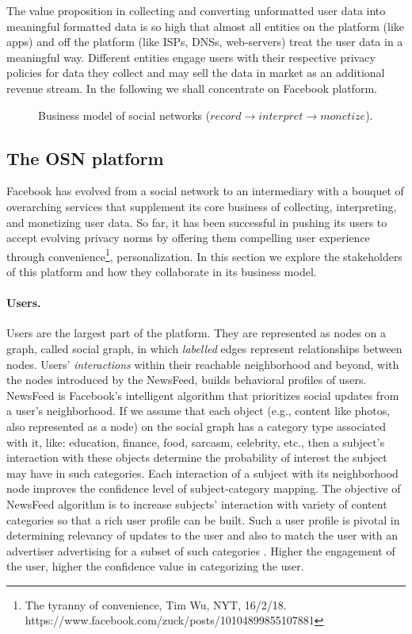 \documentclass[runningheads]{llncs}
\begin{document}
%
The value proposition in collecting and converting unformatted user
data into meaningful formatted data is so high that almost all
entities on the platform (like apps) and off the platform (like ISPs,
DNSs, web-servers) treat the user data in a meaningful way. Different
entities engage users with their respective privacy policies for data
they collect and may sell the data in market as an additional revenue
stream. In the following we shall concentrate on Facebook platform.
%
\begin{figure*}[!h]
  \centering
  {}
  \caption{Business model of social networks
    ($record \rightarrow interpret \rightarrow monetize$).}
  \label{fig:business-model}
\end{figure*}

\subsection{The OSN platform}
\label{sec:osn-platform}
\noindent Facebook has evolved from a social network to an
intermediary with a bouquet of overarching services that supplement
its core business of collecting, interpreting, and monetizing user
data. So far, it has been successful in pushing its users to accept
evolving privacy norms by offering them compelling user experience
through convenience\footnote{The tyranny of convenience, Tim Wu, NYT,
  16/2/18.\\ https://www.facebook.com/zuck/posts/10104899855107881},
personalization. In this section we explore the stakeholders of this
platform and how they collaborate in its business model.

\paragraph{Users.}
Users are the largest part of the platform. They are represented as
nodes on a graph, called social graph, in which \textit{labelled}
edges represent relationships between nodes. Users'
\textit{interactions} within their reachable neighborhood and beyond,
with the nodes introduced by the NewsFeed, builds behavioral profiles
of users. NewsFeed is Facebook's intelligent algorithm that
prioritizes social updates from a user's neighborhood. If we assume
that each object (e.g., content like photos, also represented as a
node) on the social graph has a category type associated with it,
like: education, finance, food, sarcasm, celebrity, etc., then a
subject's interaction with these objects determine the probability of
interest the subject may have in such categories. Each interaction of
a subject with its neighborhood node improves the confidence level of
subject-category mapping. The objective of NewsFeed algorithm is to
increase subjects' interaction with variety of content categories
\cite{ipip-3200} so that a rich user profile can be built. Such a user
profile is pivotal in determining relevancy of updates to the user and
also to match the user with an advertiser advertising for a subset of
such categories \cite{fb-ad-categories}. Higher the engagement of the
user, higher the confidence value in categorizing the user.
\end{document}
